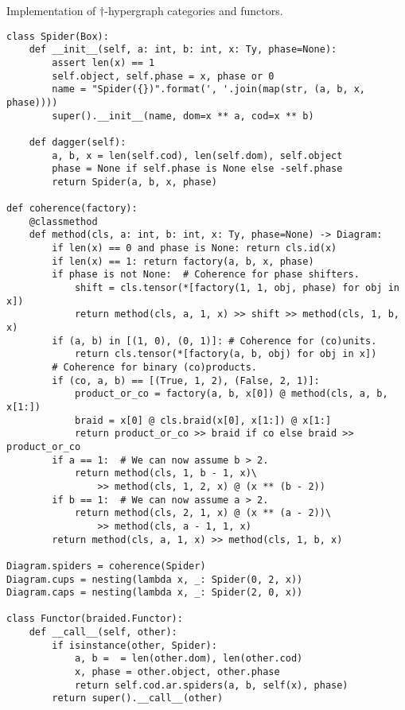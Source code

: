\begin{python}
{\normalfont Implementation of $\dagger$-hypergraph categories and functors.}

\begin{verbatim}
class Spider(Box):
    def __init__(self, a: int, b: int, x: Ty, phase=None):
        assert len(x) == 1
        self.object, self.phase = x, phase or 0
        name = "Spider({})".format(', '.join(map(str, (a, b, x, phase))))
        super().__init__(name, dom=x ** a, cod=x ** b)

    def dagger(self):
        a, b, x = len(self.cod), len(self.dom), self.object
        phase = None if self.phase is None else -self.phase
        return Spider(a, b, x, phase)

def coherence(factory):
    @classmethod
    def method(cls, a: int, b: int, x: Ty, phase=None) -> Diagram:
        if len(x) == 0 and phase is None: return cls.id(x)
        if len(x) == 1: return factory(a, b, x, phase)
        if phase is not None:  # Coherence for phase shifters.
            shift = cls.tensor(*[factory(1, 1, obj, phase) for obj in x])
            return method(cls, a, 1, x) >> shift >> method(cls, 1, b, x)
        if (a, b) in [(1, 0), (0, 1)]: # Coherence for (co)units.
            return cls.tensor(*[factory(a, b, obj) for obj in x])
        # Coherence for binary (co)products.
        if (co, a, b) == [(True, 1, 2), (False, 2, 1)]:
            product_or_co = factory(a, b, x[0]) @ method(cls, a, b, x[1:])
            braid = x[0] @ cls.braid(x[0], x[1:]) @ x[1:]
            return product_or_co >> braid if co else braid >> product_or_co
        if a == 1:  # We can now assume b > 2.
            return method(cls, 1, b - 1, x)\
                >> method(cls, 1, 2, x) @ (x ** (b - 2))
        if b == 1:  # We can now assume a > 2.
            return method(cls, 2, 1, x) @ (x ** (a - 2))\
                >> method(cls, a - 1, 1, x)
        return method(cls, a, 1, x) >> method(cls, 1, b, x)

Diagram.spiders = coherence(Spider)
Diagram.cups = nesting(lambda x, _: Spider(0, 2, x))
Diagram.caps = nesting(lambda x, _: Spider(2, 0, x))

class Functor(braided.Functor):
    def __call__(self, other):
        if isinstance(other, Spider):
            a, b =  = len(other.dom), len(other.cod)
            x, phase = other.object, other.phase
            return self.cod.ar.spiders(a, b, self(x), phase)
        return super().__call__(other)
\end{verbatim}
\end{python}

